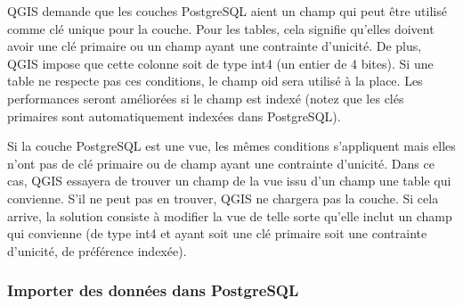 QGIS demande que les couches PostgreSQL aient un champ qui peut \^etre utilis\'e comme cl\'e unique pour la couche. Pour les tables, cela signifie qu'elles doivent avoir une cl\'e primaire ou un champ ayant une contrainte d'unicit\'e. De plus, QGIS impose que cette colonne soit de type int4 (un entier de 4 bites). Si une table ne respecte pas ces conditions, le champ oid sera utilis\'e \`a la place. Les performances seront am\'elior\'ees si le champ est index\'e (notez que les cl\'es primaires sont automatiquement index\'ees dans PostgreSQL).

Si la couche PostgreSQL est une vue, les m\^emes conditions s'appliquent mais elles n'ont pas de cl\'e primaire ou de champ ayant une contrainte d'unicit\'e. Dans ce cas, QGIS essayera de trouver un champ de la vue issu d'un champ une table qui convienne. S'il ne peut pas en trouver, QGIS ne chargera pas la couche. Si cela arrive, la solution consiste \`a modifier la vue de telle sorte qu'elle inclut un champ qui convienne (de type int4 et ayant soit une cl\'e primaire soit une contrainte d'unicit\'e, de pr\'ef\'erence index\'ee).

\subsubsection{Importer des donn\'ees dans PostgreSQL}\label{sec:loading_postgis_data}

